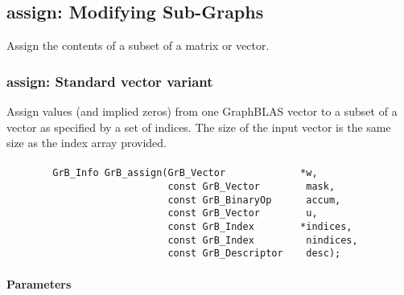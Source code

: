 \subsection{{\sf assign}: Modifying Sub-Graphs}
\label{Sec:assign}

Assign the contents of a subset of a matrix or vector.

\subsubsection{{\sf assign}: Standard vector variant}

Assign values (and implied zeros) from one GraphBLAS vector to a subset of a 
vector as specified by a set of indices. The size of the input vector is the
same size as the index array provided.

\paragraph{\syntax}

\begin{verbatim}
        GrB_Info GrB_assign(GrB_Vector             *w,
                            const GrB_Vector        mask,
                            const GrB_BinaryOp      accum,
                            const GrB_Vector        u,
                            const GrB_Index        *indices,
                            const GrB_Index         nindices,
                            const GrB_Descriptor    desc);
\end{verbatim}

\paragraph{Parameters}

